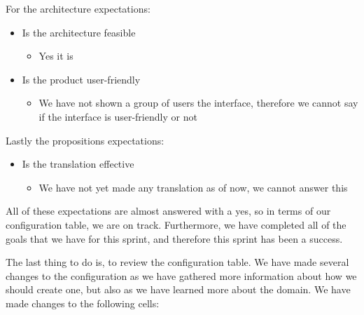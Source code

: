 For the architecture expectations:
\begin{itemize}
    \item Is the architecture feasible
    \begin{itemize}
        \item Yes it is
    \end{itemize}
    \item Is the product user-friendly
    \begin{itemize}
        \item We have not shown a group of users the interface, therefore we cannot say if the interface is user-friendly or not
    \end{itemize}
\end{itemize}

Lastly the propositions expectations:
\begin{itemize}
    \item Is the translation effective
    \begin{itemize}
        \item We have not yet made any translation as of now, we cannot answer this
    \end{itemize}
\end{itemize}

All of these expectations are almost answered with a yes, so in terms of our configuration table, we are on track.
Furthermore, we have completed all of the goals that we have for this sprint, and therefore this sprint has been a success.

The last thing to do is, to review the configuration table.
We have made several changes to the configuration as we have gathered more information about how we should create one, but also as we have learned more about the domain.
We have made changes to the following cells:


